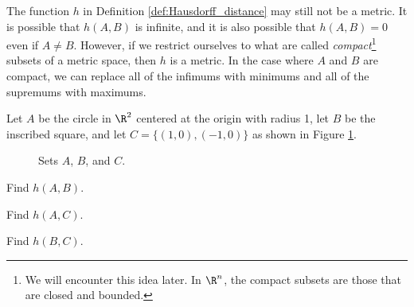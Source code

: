 The function $h$ in Definition \ref{def:Hausdorff_distance} may still not be a metric. It is possible that $h(A,B)$ is infinite, and it is also possible that $h(A,B) = 0$ even if $A \neq B$. However, if we restrict ourselves to what are called \emph{compact}\footnote{We will encounter this idea later. In $\R^n$, the compact subsets are those that are closed and bounded.} subsets of a metric space, then $h$ is a metric. In the case where $A$ and $B$ are compact, we can replace all of the infimums with minimums and all of the supremums with maximums. 



\begin{activity} \label{act:Hausdorff_example} Let $A$ be the circle in $\R^2$ centered at the origin with radius 1, let $B$ be the inscribed square, and let $C = \{(1,0), (-1,0)\}$ as shown in Figure \ref{F:Hausdorff_Example}.
\begin{figure}[t]
\begin{center}
\caption{Sets $A$, $B$, and $C$.}
\label{F:Hausdorff_Example}
\end{center}
\end{figure}
	\ba
	\item Find $h(A,B)$. 
	
	

\begin{comment}

In this case, $d(A,B) = d_E\left((0,1),\left(0, \frac{1}{\sqrt{2}}\right) = \frac{1}{\sqrt{2}} = d(B,A)$. So $h(A,B) = \frac{1}{\sqrt{2}}$.

\end{comment}
 	
	\item Find $h(A,C)$.
	
	

\begin{comment}

In this case, $d(C,A) = 0$ since $C \subset A$. However, $d(A,C) = d_E\left((0,1),(1,0) = \sqrt{2}$. So $h(A,C) = \sqrt{2}$. 

\end{comment}
	
	\item Find $h(B,C)$. 
	
	

\begin{comment}

In this case, $d(C,B) = d_E\left((1,0), \left(\frac{1}{\sqrt{2}}, 0\right) \right) = 1-\frac[1}{\sqrt{2}}$ while $d(B,C) = d_E\left(\left(0, \frac{1}{\sqrt{2}}\right), (1,0)\right) = \sqrt{3}{2}$. So $h(B,C) = \sqrt{3}{2}$. 

\end{comment}
	
	\ea
\end{activity}



